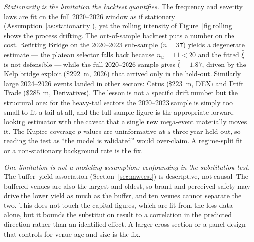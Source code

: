 \documentclass[11pt]{article}
\theoremstyle{definition}
\theoremstyle{remark}
\theoremstyle{definition}
\newcommand{\1}{\mathbf{1}}
\begin{document}
\emph{Stationarity is the limitation the backtest quantifies.} The frequency and
severity laws are fit on the full 2020--2026 window as if stationary
(Assumption~\ref{as:stationarity}), yet the rolling intensity of
Figure~\ref{fig:rolling} shows the process drifting. The out-of-sample backtest
puts a number on the cost. Refitting Bridge on the 2020--2023 sub-sample
($n=37$) yields a degenerate estimate --- the plateau selector falls back
because $n_u=11<20$ and the fitted $\hat\xi$ is not defensible --- while the
full 2020--2026 sample gives $\hat\xi=1.87$, driven by the Kelp bridge
exploit ($\$292$~m, 2026) that arrived only in the hold-out. Similarly large
2024--2026 events landed in other sectors: Cetus ($\$223$~m, DEX) and Drift
Trade ($\$285$~m, Derivatives). The lesson is not a specific drift number but
the structural one: for the heavy-tail sectors the 2020--2023 sample is
simply too small to fit a tail at all, and the full-sample figure is the
appropriate forward-looking estimator with the caveat that a single new
mega-event materially moves it. The Kupiec coverage $p$-values are
uninformative at a three-year hold-out, so reading the test as ``the model is
validated'' would over-claim. A regime-split fit or a non-stationary
background rate is the fix.

\emph{One limitation is not a modeling assumption: confounding in the
substitution test.} The buffer--yield association (Section~\ref{sec:mwtest}) is
descriptive, not causal. The buffered venues are also the largest and oldest, so
brand and perceived safety may drive the lower yield as much as the buffer, and
ten venues cannot separate the two. This does not touch the capital figures,
which are fit from the loss data alone, but it bounds the substitution result to
a correlation in the predicted direction rather than an identified effect. A
larger cross-section or a panel design that controls for venue age and size is
the fix.
\end{document}
